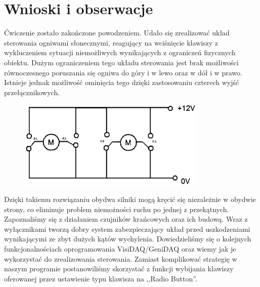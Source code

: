 \documentclass[a4paper, 12pt]{article}
\begin{document}
	\section{Wnioski i obserwacje}
		Ćwiczenie zostało zakończone powodzeniem. Udało się zrealizować układ sterowania ogniwami słonecznymi, reagujący na wciśnięcie klawiszy z wykluczeniem sytuacji niemożliwych wynikających z ograniczeń fizycznych obiektu.
		\newline
		\newline
		Dużym ograniczeniem tego układu sterowania jest brak możliwości równoczesnego poruszania się ogniwa do góry i w lewo oraz w dół i w prawo. Istnieje jednak możliwość ominięcia tego dzięki zastosowaniu czterech wyjść przełącznikowych. 
		\begin{figure}[H]
			\centering
			\includegraphics[width = 0.8\textwidth]{./img/good_motors.png}
		\end{figure}
		\noindent Dzięki takiemu rozwiązaniu obydwa silniki mogą kręcić się niezależnie w obydwie strony, co eliminuje problem niemożności ruchu po jednej z przekątnych.
		\newline
		\newline 
		Zapoznaliśmy się z działaniem czujników krańcowych oraz ich budową. Wraz z wyłącznikami tworzą dobry system zabezpieczający układ przed uszkodzeniami wynikającymi ze zbyt dużych kątów wychylenia.
		\newline
		\newline 
		Dowiedzieliśmy się o kolejnych funkcjonalnościach oprogramowania VisiDAQ/GeniDAQ oraz wiemy jak je wykorzystać do zrealizowania sterowania. Zamiast komplikować strategię w naszym programie postanowiliśmy skorzystać z funkcji wybijania klawiszy oferowanej przez ustawienie typu klawisza na ,,Radio Button''.
\end{document}
